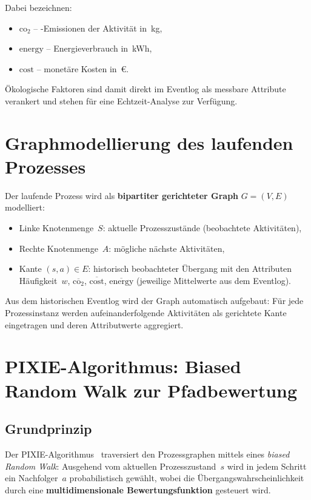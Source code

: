 \documentclass[12pt, a4paper]{article}
\begin{document}
\noindent
Dabei bezeichnen:
\begin{itemize}
  \item $\text{co}_2$ -- \COO-Emissionen der Aktivität in~kg,
  \item $\text{energy}$ -- Energieverbrauch in~kWh,
  \item $\text{cost}$ -- monetäre Kosten in~\euro{}.
\end{itemize}

Ökologische Faktoren sind damit direkt im Eventlog
als messbare Attribute verankert und stehen für eine
Echtzeit-Analyse zur Verfügung.

\section{Graphmodellierung des laufenden Prozesses}
\label{sec:graph}

Der laufende Prozess wird als \textbf{bipartiter gerichteter Graph}
$G = (V, E)$ modelliert:
\begin{itemize}
  \item Linke Knotenmenge~$S$: aktuelle Prozesszustände (beobachtete Aktivitäten),
  \item Rechte Knotenmenge~$A$: mögliche nächste Aktivitäten,
  \item Kante $(s, a) \in E$: historisch beobachteter Übergang mit den Attributen
        Häufigkeit~$w$, $\overline{\text{co}_2}$, $\overline{\text{cost}}$,
        $\overline{\text{energy}}$ (jeweilige Mittelwerte aus dem Eventlog).
\end{itemize}

Aus dem historischen Eventlog wird der Graph automatisch aufgebaut:
Für jede Prozessinstanz werden aufeinanderfolgende Aktivitäten
als gerichtete Kante eingetragen und deren Attributwerte aggregiert.

\section{PIXIE-Algorithmus: Biased Random Walk zur Pfadbewertung}
\label{sec:pixie}

\subsection{Grundprinzip}

Der PIXIE-Algorithmus~\parencite{pixie2018} traversiert den Prozessgraphen
mittels eines \emph{biased Random Walk}:
Ausgehend vom aktuellen Prozesszustand~$s$ wird in jedem Schritt
ein Nachfolger~$a$ probabilistisch gewählt,
wobei die Übergangswahrscheinlichkeit durch eine
\textbf{multidimensionale Bewertungsfunktion} gesteuert wird.
\end{document}
